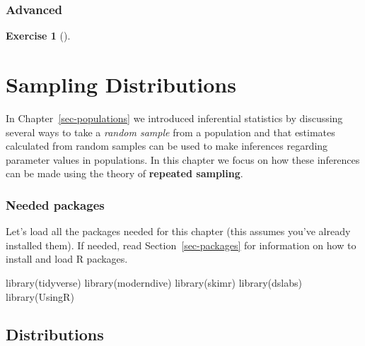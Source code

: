 \documentclass[
  letterpaper,
  DIV=11,
  numbers=noendperiod]{scrreprt}
\newenvironment{Shaded}{\begin{snugshade}}{\end{snugshade}}
\newcommand{\FunctionTok}[1]{\textcolor[rgb]{0.28,0.35,0.67}{#1}}
\newcommand{\NormalTok}[1]{\textcolor[rgb]{0.00,0.23,0.31}{#1}}
\theoremstyle{definition}
\newtheorem{exercise}{Exercise}[chapter]
\theoremstyle{remark}
\begin{document}
\hypertarget{sec-ex08-advanced}{%
\subsection{Advanced}\label{sec-ex08-advanced}}

\leavevmode{}%
\begin{exercise}[]\label{exr-ch08-adv1}

\end{exercise}

\hypertarget{sec-sampling}{%
\chapter{Sampling Distributions}\label{sec-sampling}}

In Chapter~\ref{sec-populations} we introduced inferential statistics by
discussing several ways to take a \emph{random sample} from a population
and that estimates calculated from random samples can be used to make
inferences regarding parameter values in populations. In this chapter we
focus on how these inferences can be made using the theory of
\textbf{repeated sampling}.

\hypertarget{needed-packages-3}{%
\subsection*{Needed packages}\label{needed-packages-3}}

Let's load all the packages needed for this chapter (this assumes you've
already installed them). If needed, read Section~\ref{sec-packages} for
information on how to install and load R packages.

\begin{Shaded}
\begin{Highlighting}[]
\FunctionTok{library}\NormalTok{(tidyverse)}
\FunctionTok{library}\NormalTok{(moderndive)}
\FunctionTok{library}\NormalTok{(skimr)}
\FunctionTok{library}\NormalTok{(dslabs)}
\FunctionTok{library}\NormalTok{(UsingR)}
\end{Highlighting}
\end{Shaded}

\hypertarget{sec-parametric}{%
\section{Distributions}\label{sec-parametric}}
\end{document}
